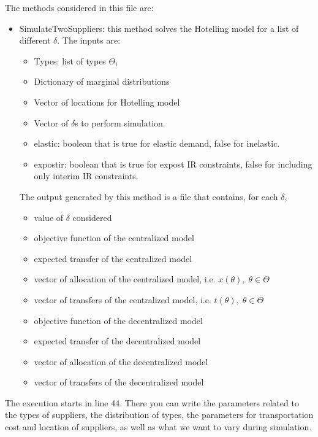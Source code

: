 \documentclass[11pt, oneside]{article}
\begin{document}
The methods considered in this file are:
\begin{itemize}
  \item SimulateTwoSuppliers: this method solves the Hotelling model for a list of different \(\delta\).
  The inputs are:
  \begin{itemize}
    \item Types: list of types \(\Theta_i\)
    \item Dictionary of marginal distributions
    \item Vector of locations for Hotelling model
    \item Vector of \(\delta\)s to perform simulation.
    \item elastic: boolean that is true for elastic demand, false for inelastic.
    \item expostir: boolean that is true for expost IR constraints, false for including only interim IR constraints.
  \end{itemize}

  The output generated by this method is a file that contains, for each \(\delta\),
  \begin{itemize}
    \item value of \(\delta\) considered
    \item objective function of the centralized model
    \item expected transfer of the centralized model
    \item vector of allocation of the centralized model, i.e. \(x(\theta), \; \theta \in \Theta\)
    \item vector of transfers of the centralized model, i.e. \(t(\theta), \; \theta \in \Theta\)
    \item objective function of the decentralized model
    \item expected transfer of the decentralized model
    \item vector of allocation of the decentralized model
    \item vector of transfers of the decentralized model
  \end{itemize}
\end{itemize}

The execution starts in line 44. There you can write the parameters related to the
types of suppliers, the distribution of types, the parameters for transportation
cost and location of suppliers, as well as what we want to vary during simulation.
\end{document}
